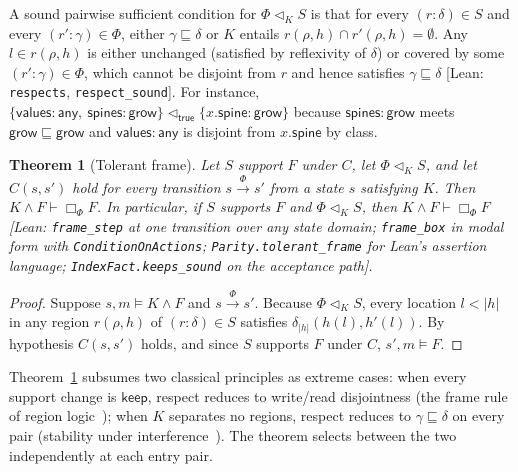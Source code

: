 \documentclass[10pt,a4paper]{article}
\newtheorem{theorem}{Theorem}
\theoremstyle{definition}
\theoremstyle{remark}
\newcommand{\bx}[1]{\Box_{#1}}
\newcommand{\kw}[1]{\mathsf{#1}}
\newcommand{\keep}{\kw{keep}}
\newcommand{\grow}{\kw{grow}}
\newcommand{\any}{\kw{any}}
\newcommand{\val}{\kw{values}}
\newcommand{\st}{\kw{spines}}
\newcommand{\len}[1]{|#1|}
\newcommand{\tr}[1]{\xrightarrow{#1}}
\newcommand{\resp}{\mathrel{\triangleleft}}
\newcommand{\lean}[1]{\texttt{\small #1}}
\newcommand{\status}[1]{\textsf{\small[#1]}}
\begin{document}
\noindent
A sound pairwise sufficient condition for $\Phi\resp_K S$ is that for
every $(r:\delta)\in S$ and every $(r':\gamma)\in\Phi$, either
$\gamma\sqsubseteq\delta$ or $K$ entails $r(\rho,h)\cap r'(\rho,h)=\emptyset$.
Any $l\in r(\rho,h)$ is either unchanged (satisfied by reflexivity of
$\delta$) or covered by some $(r':\gamma)\in\Phi$, which cannot be
disjoint from $r$ and hence satisfies $\gamma\sqsubseteq\delta$
\status{Lean: \lean{respects}, \lean{respect\_sound}}.
For instance, $\{\val:\any,\ \st:\grow\}\resp_{\kw{true}}\{x.\kw{spine}:\grow\}$
because $\st:\grow$ meets $\grow\sqsubseteq\grow$ and $\val:\any$ is
disjoint from $x.\kw{spine}$ by class.

\begin{theorem}[Tolerant frame]\label{thm:frame}
Let $S$ support $F$ under $C$, let $\Phi\resp_K S$, and let $C(s,s')$
hold for every transition $s\tr{\Phi} s'$ from a state $s$ satisfying
$K$. Then $K\wedge F\vdash\bx{\Phi}F$. In particular, if $S$ supports
$F$ and $\Phi\resp_K S$, then $K\wedge F\vdash\bx{\Phi}F$
\status{Lean: \lean{frame\_step} at one transition over any state domain; \lean{frame\_box} in modal form with \lean{ConditionOnActions}; \lean{Parity.tolerant\_frame} for Lean's assertion language; \lean{IndexFact.keeps\_sound} on the acceptance path}.
\end{theorem}
\begin{proof}
Suppose $s,m\models K\wedge F$ and $s\tr{\Phi} s'$. Because
$\Phi\resp_K S$, every location $l<\len h$ in any region $r(\rho,h)$ of
$(r:\delta)\in S$ satisfies $\delta_{\len h}(h(l),h'(l))$. By hypothesis
$C(s,s')$ holds, and since $S$ supports $F$ under $C$,
$s',m\models F$.
\end{proof}

\noindent
Theorem~\ref{thm:frame} subsumes two classical principles as extreme
cases: when every support change is $\keep$, respect reduces to write/read
disjointness (the frame rule of region logic~\cite{bnr}); when $K$
separates no regions, respect reduces to $\gamma\sqsubseteq\delta$ on
every pair (stability under interference~\cite{jones}). The theorem
selects between the two independently at each entry pair.
\end{document}
